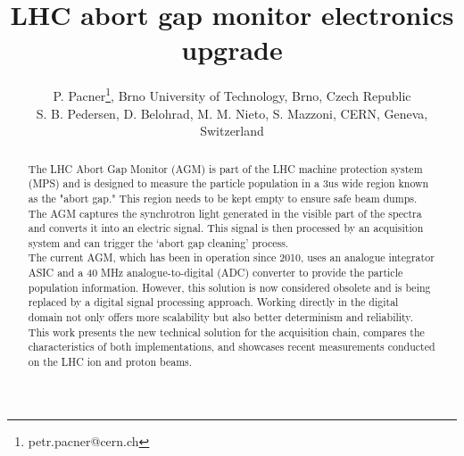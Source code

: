 



\title{LHC abort gap monitor electronics upgrade}

\author{P. Pacner\thanks{petr.pacner@cern.ch}, Brno University of Technology, Brno, Czech Republic \\
		S. B. Pedersen, D. Belohrad, M. M. Nieto, S. Mazzoni, CERN, Geneva, Switzerland}
	
\maketitle

\begin{abstract}
    The LHC Abort Gap Monitor (AGM) is part of the LHC machine protection
    system (MPS) and is designed to measure the particle population in a 3us
    wide region known as the "abort gap." This region needs to be kept empty to
    ensure safe beam dumps. The AGM captures the synchrotron light generated in
    the visible part of the spectra and converts it into an electric signal.
    This signal is then processed by an acquisition system and can trigger the
    ‘abort gap cleaning’ process.\\
    The current AGM, which has been in operation since 2010, uses an analogue
    integrator ASIC and a 40 MHz analogue-to-digital (ADC) converter to provide
    the particle population information. However, this solution is now
    considered obsolete and is being replaced by a digital signal processing
    approach. Working directly in the digital domain not only offers more
    scalability but also better determinism and reliability. \\
    This work presents the new technical solution for the acquisition chain,
    compares the characteristics of both implementations, and showcases recent
    measurements conducted on the LHC ion and proton beams.
\end{abstract}

